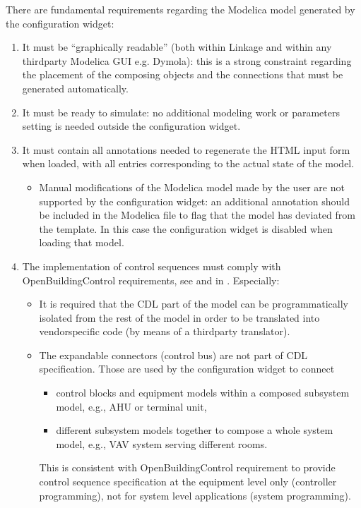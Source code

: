 \documentclass[letterpaper,10pt, openany,english]{sphinxmanual}
\begin{document}
There are fundamental requirements regarding the Modelica model generated by the configuration widget:
\begin{enumerate}
%
\item {} 
It must be “graphically readable” (both within Linkage and within any third\sphinxhyphen{}party Modelica GUI e.g. Dymola): this is a strong constraint regarding the placement of the composing objects and the connections that must be generated automatically.

\item {} 
It must be ready to simulate: no additional modeling work or parameters setting is needed outside the configuration widget.

\item {} 
It must contain all annotations needed to regenerate the HTML input form when loaded, with all entries corresponding to the actual state of the model.
\begin{itemize}
\item {} 
Manual modifications of the Modelica model made by the user are not supported by the configuration widget: an additional annotation should be included in the Modelica file to flag that the model has deviated from the template. In this case the configuration widget is disabled when loading that model.

\end{itemize}

\item {} 
The implementation of control sequences must comply with OpenBuildingControl requirements, see  and  in . Especially:
\begin{itemize}
\item {} 
It is required that the CDL part of the model can be programmatically isolated from the rest of the model in order to be translated into vendor\sphinxhyphen{}specific code (by means of a third\sphinxhyphen{}party translator).

\item {} 
The expandable connectors (control bus) are not part of CDL specification. Those are used by the configuration widget to connect
\begin{itemize}
\item {} 
control blocks and equipment models within a composed sub\sphinxhyphen{}system model, e.g., AHU or terminal unit,

\item {} 
different sub\sphinxhyphen{}system models together to compose a whole system model, e.g., VAV system serving different rooms.

\end{itemize}

This is consistent with OpenBuildingControl requirement to provide control sequence specification at the equipment level only (controller programming), not for system level applications (system programming).

\end{itemize}

\end{enumerate}
\end{document}
